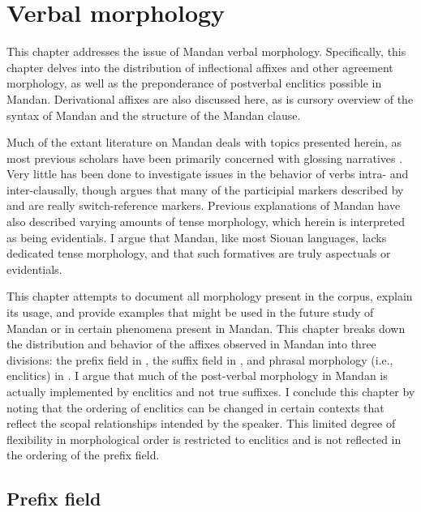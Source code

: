 \chapter{Verbal morphology}\label{chapter3}

This chapter addresses the issue of Mandan verbal morphology. Specifically, this chapter delves into the distribution of inflectional affixes and other agreement morphology, as well as the preponderance of postverbal enclitics possible in Mandan. Derivational affixes are also discussed here, as is cursory overview of the syntax of Mandan and the structure of the Mandan clause.

Much of the extant literature on Mandan deals with topics presented herein, as most previous scholars have been primarily concerned with glossing narratives \citep{kennard1936,hollow1970,coberly1979,mixco1997a}. Very little has been done to investigate issues in the behavior of verbs intra- and inter-clausally, though \citet{mixco1997b} argues that many of the participial markers described by \citet{kennard1936} and \citet{hollow1970} are really switch-reference markers. Previous explanations of Mandan have also described varying amounts of tense morphology, which herein is interpreted as being evidentials. I argue that Mandan, like most Siouan languages, lacks dedicated tense morphology, and that such formatives are truly aspectuals or evidentials.

This chapter attempts to document all morphology present in the corpus, explain its usage, and provide examples that might be used in the future study of Mandan or in certain phenomena present in Mandan. This chapter breaks down the distribution and behavior of the affixes observed in Mandan into three divisions: the prefix field in , the suffix field in , and phrasal morphology (i.e., enclitics) in . I argue that much of the post-verbal morphology in Mandan is actually implemented by enclitics and not true suffixes. I conclude this chapter by noting that the ordering of enclitics can be changed in certain contexts that reflect the scopal relationships intended by the speaker. This limited degree of flexibility in morphological order is restricted to enclitics and is not reflected in the ordering of the prefix field.

\section{Prefix field}\label{SecPrefixField}

